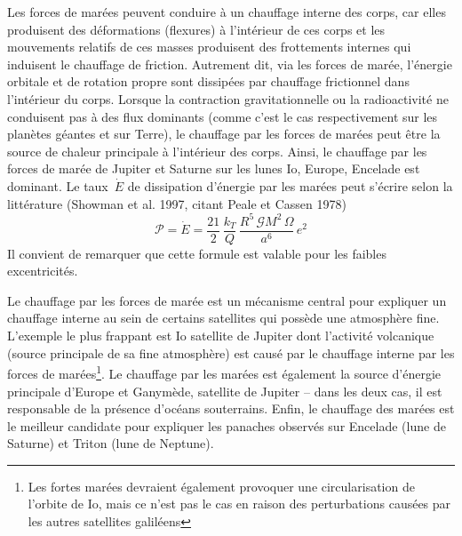 
\sk
Les forces de marées peuvent conduire à un chauffage interne des corps,
car elles produisent des déformations (flexures) à l'intérieur de ces corps
et les mouvements relatifs de ces masses produisent des frottements internes
qui induisent le chauffage de friction.
Autrement dit, via les forces de marée, l'énergie orbitale et de rotation propre sont dissipées par chauffage frictionnel dans l'intérieur du corps.
Lorsque la contraction gravitationnelle ou la radioactivité ne conduisent
pas à des flux dominants (comme c'est le cas respectivement sur les planètes géantes et sur Terre),
le chauffage par les forces de marées
peut être la source de chaleur principale à l'intérieur des corps.
Ainsi, le chauffage par les forces de marée de Jupiter et Saturne sur 
les lunes Io, Europe, Encelade est dominant.
Le taux~$\dot{E}$ de dissipation d'énergie par les marées peut s'écrire
selon la littérature (Showman et al. 1997, citant Peale et Cassen 1978)
\[ \mathcal{P} = \dot{E} = \frac{21}{2} \, \frac{k_T}{Q} \, \frac{R^5\,\mathcal{G}M^2\,\Omega}{a^6} \, e^2 \]
\noindent Il convient de remarquer que cette formule est valable
pour les faibles excentricités.


\sk
Le chauffage par les forces de marée est un mécanisme central pour
expliquer un chauffage interne au sein de certains satellites
qui possède une atmosphère fine. L'exemple le plus frappant
est Io satellite de Jupiter dont l'activité volcanique
(source principale de sa fine atmosphère)
est causé par le chauffage interne par les forces de 
marées\footnote{Les fortes marées devraient également provoquer
une circularisation de l'orbite de Io, mais ce n'est pas le cas
en raison des perturbations causées par les autres satellites galiléens}.
Le chauffage par les marées est également la source d'énergie
principale d'Europe et Ganymède, satellite de Jupiter -- dans les
deux cas, il est responsable de la présence d'océans souterrains.
Enfin, le chauffage des marées est le meilleur candidate pour
expliquer les panaches observés sur Encelade (lune de Saturne)
et Triton (lune de Neptune).









